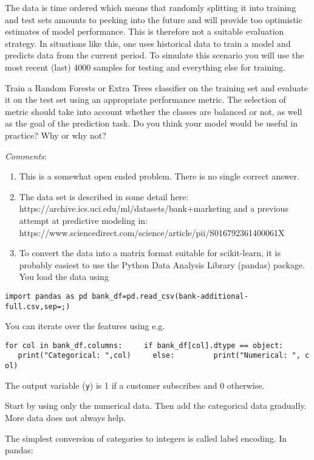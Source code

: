 \documentclass[11pt]{article}
\begin{document}
The data is time ordered which means that randomly splitting it into
training and test sets amounts to peeking into the future and will
provide too optimistic estimates of model performance. This is therefore
not a suitable evaluation strategy. In situations like this, one uses
historical data to train a model and predicts data from the current
period. To simulate this scenario you will use the most recent (last)
4000 samples for testing and everything else for training.

Train a Random Forests or Extra Trees classifier on the training set and
evaluate it on the test set using an appropriate performance metric. The
selection of metric should take into account whether the classes are
balanced or not, as well as the goal of the prediction task. Do you
think your model would be useful in practice? Why or why not?

\emph{Comments}:

\begin{enumerate}
\def\labelenumi{\arabic{enumi})}
\item
  This is a somewhat open ended problem. There is no single correct
  answer.
\item
  The data set is described in some detail here:
  https://archive.ics.uci.edu/ml/datasets/bank+marketing and a previous
  attempt at predictive modeling in:
  https://www.sciencedirect.com/science/article/pii/S016792361400061X
\item
  To convert the data into a matrix format suitable for scikit-learn, it
  is probably easiest to use the Python Data Analysis Library (pandas)
  package. You load the data using
\end{enumerate}

\texttt{import\ pandas\ as\ pd\ bank\_df=pd.read\_csv(\textquotesingle{}bank-additional-full.csv\textquotesingle{},sep=\textquotesingle{};\textquotesingle{})}

You can iterate over the features using e.g.

\texttt{for\ col\ in\ bank\_df.columns:\ \ \ \ \ if\ bank\_df{[}col{]}.dtype\ ==\ object:\ \ \ \ \ \ \ \ \ print("Categorical:\ ",col)\ \ \ \ \ else:\ \ \ \ \ \ \ \ \ print("Numerical:\ ",\ col)}

The output variable (\texttt{y}) is 1 if a customer subscribes and 0
otherwise.

Start by using only the numerical data. Then add the categorical data
gradually. More data does not always help.

The simplest conversion of categories to integers is called label
encoding. In pandas:
\end{document}
